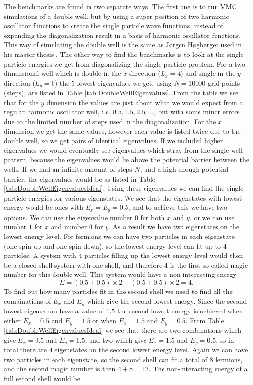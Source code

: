 \documentclass[../main.tex]{subfiles}
\begin{document}
The benchmarks are found in two separate ways. The first one is to run VMC simulations of a double well, but by using a super position of two harmonic oscillator functions to create the single particle wave functions, instead of expanding the diagonalization result in a basis of harmonic oscillator functions. This way of simulating the double well is the same as Jørgen Høgberget used in his master thesis \cite{Jorgen}. The other way to find the benchmarks is to look at the single particle energies we get from diagonalizing the single particle problem. For a two-dimensional well which is double in the $x$ direction ($L_x = 4$) and single in the $y$ direction ($L_y = 0$) the $5$ lowest eigenvalues we get, using $N=10000$ grid points (steps), are listed in Table \ref{tab:DoubleWellEigenvalues}. From the table we see that for the $y$ dimension the values are just about what we would expect from a regular harmonic oscillator well, i.e. $0.5, 1.5, 2.5, \dots$, but with some minor errors due to the limited number of steps used in the diagonalization. For the $x$ dimension we get the same values, however each value is listed twice due to the double well, so we get pairs of identical eigenvalues. If we included higher eigenvalues we would eventually see eigenvalues which stray from the single well pattern, because the eigenvalues would lie above the potential barrier between the wells. If we had an infinite amount of steps $N$, and a high enough potential barrier, the eigenvalues would be as listed in Table \ref{tab:DoubleWellEigenvaluesIdeal}. Using these eigenvalues we can find the single particle energies for various eigenstates. We see that the eigenstates with lowest energy would be ones with $E_x=E_y=0.5$, and to achieve this we have two options. We can use the eigenvalue number $0$ for both $x$ and $y$, or we can use number $1$ for $x$ and number $0$ for $y$. As a result we have two eigenstates on the lowest energy level. For fermions we can have two particles in each eigenstate (one spin-up and one spin-down), so the lowest energy level can fit up to $4$ particles. A system with $4$ particles filling up the lowest energy level would then be a closed shell system with one shell, and therefore $4$ is the first so-called magic number for this double well. This system would have a non-interacting energy 
\begin{equation}
    E = (0.5+0.5)\times 2 + (0.5+0.5)\times 2 = 4.
\end{equation} 
To find out how many particles fit in the second shell we need to find all the combinations of $E_x$ and $E_y$ which give the second lowest energy. Since the second lowest eigenvalues have a value of $1.5$ the second lowest energy is achieved when either $E_x = 0.5$ and $E_y = 1.5$ or when $E_x = 1.5$ and $E_y = 0.5$. From Table \ref{tab:DoubleWellEigenvaluesIdeal} we see that there are two combinations which give $E_x = 0.5$ and $E_y = 1.5$, and two which give $E_x = 1.5$ and $E_y = 0.5$, so in total there are $4$ eigenstates on the second lowest energy level. Again we can have two particles in each eigenstate, so the second shell can fit a total of $8$ fermions, and the second magic number is then $4 + 8 = 12$. The non-interacting energy of a full second shell would be
\end{document}
